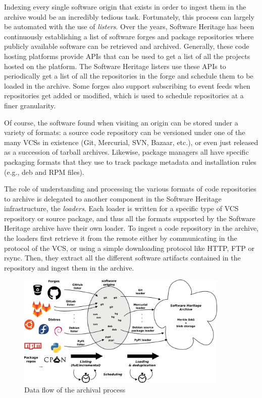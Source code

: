 Indexing every single software origin that exists in order to ingest them in
the archive would be an incredibly tedious task. Fortunately, this process can
largely be automated with the use of \emph{listers}. Over the years, Software
Heritage has been continuously establishing a list of software forges and
package repositories where publicly available software can be retrieved and
archived. Generally, these code hosting platforms provide APIs that can be used
to get a list of all the projects hosted on the platform. The Software Heritage
listers use these APIs to periodically get a list of all the repositories in
the forge and schedule them to be loaded in the archive. Some forges also
support subscribing to event feeds when repositories get added or modified,
which is used to schedule repositories at a finer granularity.

Of course, the software found when visiting an origin can be stored under a
variety of formats: a source code repository can be versioned under one of the
many \glspl{VCS} in existence (Git, Mercurial, SVN, Bazaar, etc.), or even just
released as a succession of tarball archives. Likewise, package managers all
have specific packaging formats that they use to track package metadata and
installation rules (e.g., deb and RPM files).

The role of understanding and processing the various formats of code
repositories to archive is delegated to another component in the Software
Heritage infrastructure, the \emph{loaders}. Each loader is written for a
specific type of \gls{VCS} repository or source package, and thus all the
formats supported by the Software Heritage archive have their own loader. To
ingest a code repository in the archive, the loaders first retrieve it from the
remote either by communicating in the protocol of the VCS, or using a simple
downloading protocol like HTTP, FTP or rsync. Then, they extract all the
different software artifacts contained in the repository and ingest them in the
archive.

\begin{figure}
\begin{center}
    \includegraphics[width=0.9\textwidth]{../img/swh-dataflow}
\end{center}
\caption{Data flow of the archival process}%
\label{fig:archival-data-flow}
\end{figure}

